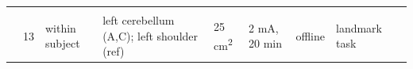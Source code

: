 \documentclass[11pt,]{memoir}
\begin{document}
\begin{longtable}[]{@{}lllllllll@{}}
\begin{minipage}[t]{0.02\columnwidth}
\strut
\end{minipage} & \begin{minipage}[t]{0.04\columnwidth}\raggedright
\strut
\end{minipage} & \begin{minipage}[t]{0.10\columnwidth}\raggedright
\strut
\end{minipage} & \begin{minipage}[t]{0.04\columnwidth}\raggedright
\strut
\end{minipage} & \begin{minipage}[t]{0.04\columnwidth}\raggedright
\strut
\end{minipage} & \begin{minipage}[t]{0.04\columnwidth}\raggedright
\strut
\end{minipage} & \begin{minipage}[t]{0.10\columnwidth}\raggedright
\strut
\end{minipage} & \begin{minipage}[t]{0.28\columnwidth}\raggedright
\strut
\end{minipage}\tabularnewline
\begin{minipage}[t]{0.09\columnwidth}\raggedright
\textcite{Picazio2015}\strut
\end{minipage} & \begin{minipage}[t]{0.02\columnwidth}\raggedright
13\strut
\end{minipage} & \begin{minipage}[t]{0.04\columnwidth}\raggedright
within
subject\strut
\end{minipage} & \begin{minipage}[t]{0.10\columnwidth}\raggedright
left cerebellum
(A,C); left shoulder
(ref)\strut
\end{minipage} & \begin{minipage}[t]{0.04\columnwidth}\raggedright
25
cm\textsuperscript{2}\strut
\end{minipage} & \begin{minipage}[t]{0.04\columnwidth}\raggedright
2 mA,
20 min\strut
\end{minipage} & \begin{minipage}[t]{0.04\columnwidth}\raggedright
offline\strut
\end{minipage} & \begin{minipage}[t]{0.10\columnwidth}\raggedright
landmark task\strut
\end{minipage} & \begin{minipage}[t]{0.28\columnwidth}\raggedright

\end{minipage}
\end{longtable}
\end{document}
